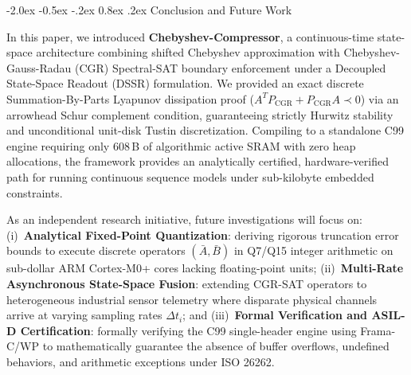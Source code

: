 \documentclass[10pt,twocolumn,a4paper]{article}
\makeatletter
\renewcommand\section{\@startsection{section}{1}{\z@}%
  {-2.0ex \@plus -0.5ex \@minus -.2ex}%
  {0.8ex \@plus .2ex}%
  {\normalfont\large\bfseries}}
\theoremstyle{plain}
\theoremstyle{definition}
\makeatother
\begin{document}
\balance
\section{Conclusion and Future Work}

In this paper, we introduced \textbf{Chebyshev-Compressor}, a continuous-time state-space architecture combining shifted Chebyshev approximation with Chebyshev-Gauss-Radau (CGR) Spectral-SAT boundary enforcement under a Decoupled State-Space Readout (DSSR) formulation. We provided an exact discrete Summation-By-Parts Lyapunov dissipation proof ($A^T P_{\mathrm{CGR}} + P_{\mathrm{CGR}} A \prec 0$) via an arrowhead Schur complement condition, guaranteeing strictly Hurwitz stability and unconditional unit-disk Tustin discretization. Compiling to a standalone C99 engine requiring only 608\,B of algorithmic active SRAM with zero heap allocations, the framework provides an analytically certified, hardware-verified path for running continuous sequence models under sub-kilobyte embedded constraints.

As an independent research initiative, future investigations will focus on: (i)~\textbf{Analytical Fixed-Point Quantization}: deriving rigorous truncation error bounds to execute discrete operators $(\bar{A}, \bar{B})$ in Q7/Q15 integer arithmetic on sub-dollar ARM Cortex-M0+ cores lacking floating-point units; (ii)~\textbf{Multi-Rate Asynchronous State-Space Fusion}: extending CGR-SAT operators to heterogeneous industrial sensor telemetry where disparate physical channels arrive at varying sampling rates $\Delta t_i$; and (iii)~\textbf{Formal Verification and ASIL-D Certification}: formally verifying the C99 single-header engine using Frama-C/WP to mathematically guarantee the absence of buffer overflows, undefined behaviors, and arithmetic exceptions under ISO 26262.

\let\oldthebibliography\thebibliography
\let\endoldthebibliography\endthebibliography
\renewenvironment{thebibliography}[1]{%
  \begin{oldthebibliography}{#1}%
    \scriptsize
    \setlength{\itemsep}{0.3pt}%
    \setlength{\parskip}{0pt}%
}{%
  \end{oldthebibliography}%
}
\end{document}
